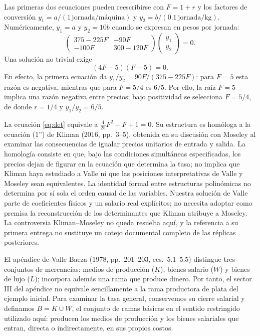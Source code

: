 \documentclass[10pt,twoside]{article}
\begin{document}
Las primeras dos ecuaciones pueden reescribirse con $F=1+r$ y los factores de conversión $y_1=a/(1\,\text{jornada/máquina})$ y $y_2=b/(0.1\,\text{jornada/kg})$. Numéricamente, $y_1=a$ y $y_2=10b$ cuando se expresan en pesos por jornada:
\[
\begin{pmatrix}
375-225F&-90F\\
-100F&300-120F
\end{pmatrix}
\begin{pmatrix}y_1\\y_2\end{pmatrix}=0.
\]
Una solución no trivial exige
\begin{equation}
(4F-5)(F-5)=0.\label{eq:det}
\end{equation}
En efecto, la primera ecuación da $y_1/y_2=90F/(375-225F)$: para $F=5$ esta razón es negativa, mientras que para $F=5/4$ es $6/5$. Por ello, la raíz $F=5$ implica una razón negativa entre precios; bajo positividad se selecciona $F=5/4$, de donde $r=1/4$ y $y_1/y_2=6/5$.

La ecuación \eqref{eq:det} equivale a $\frac{4}{25}F^2-F+1=0$. Su estructura es homóloga a la ecuación (1'') de Kliman (2016, pp.~3--5), obtenida en su discusión con Moseley al examinar las consecuencias de igualar precios unitarios de entrada y salida. La homología consiste en que, bajo las condiciones simultáneas especificadas, los precios dejan de figurar en la ecuación que determina la tasa; no implica que Kliman haya estudiado a Valle ni que las posiciones interpretativas de Valle y Moseley sean equivalentes. La identidad formal entre estructuras polinómicas no determina por sí sola el orden causal de las variables. Nuestra solución de Valle parte de coeficientes físicos y un salario real explícitos; no necesita adoptar como premisa la reconstrucción de los determinantes que Kliman atribuye a Moseley. La controversia Kliman--Moseley no queda resuelta aquí, y la referencia a su primera entrega no sustituye un cotejo documental completo de las réplicas posteriores.

El apéndice de Valle Baeza (1978, pp.~201--203, ecs.~5.1--5.5) distingue tres conjuntos de mercancías: medios de producción ($K$), bienes salario ($W$) y bienes de lujo ($L$); incorpora además una rama que produce dinero. Por tanto, el sector III del apéndice no equivale sencillamente a la rama productora de plata del ejemplo inicial. Para examinar la tasa general, conservemos su cierre salarial y definamos $B=K\cup W$, el conjunto de ramas básicas en el sentido restringido utilizado aquí: producen los medios de producción y los bienes salariales que entran, directa o indirectamente, en sus propios costos.
\end{document}
